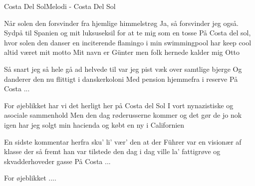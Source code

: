 \begin{sang}{Costa Del Sol}{Melodi - Costa Del Sol}
\begin{vers}
Når solen den forsvinder
fra hjemlige himmelstrøg
Ja, så forsvinder jeg også.
Sydpå til Spanien og mit luksuseksil
for at te mig som en tosse
På Costa del sol, hvor solen den danser
en inciterende flamingo i min swimmingpool
har keep cool altid været mit motto
Mit navn er Günter
men folk hernede kalder mig Otto
\end{vers}
\begin{vers}
Så snart jeg så hele gå ad helvede til
var jeg pist væk over samtlige bjerge
Og danderer den nu
flittigt i danskerkoloni
Med pension hjemmefra i reserve
På Costa ...
\end{vers}

\begin{vers}
For øjeblikket har vi det herligt
her på Costa del Sol
I vort nynazistiske
og asociale sammenhold
Men den dag røderusserne kommer
og det gør de jo nok igen
har jeg solgt min hacienda
og købt en ny i Californien
\end{vers}
\begin{vers}
En sidste kommentar herfra
sku' li' vær' den
at der Führer var en visionær af klasse
der så fremt han var tilstede
den dag i dag
ville la' fattigrøve
og skvadderhoveder gasse
På Costa ...
\end{vers}
\begin{vers}
For øjeblikket ....
\end{vers}
\laps
\end{sang}
